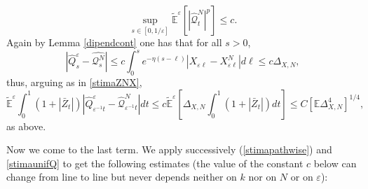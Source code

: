 \documentclass[reqno,a4paper,11 pt]{article}
\def \E {\mathbb{E}}
\def \e {\varepsilon}
\def\F {\mathcal{F}}
\numberwithin{equation}{section}
\begin{document}
\begin{equation}\label{stimaunifQ}
\sup_{s \in [0, 1/\e] } \widetilde{\E}^\e[|\hat{\mathcal{Q}}^{N}_t|^p]\leq c.
\end{equation}
Again by  Lemma \ref{dipendcont} one has that for all $s>0$, $$|\hat{{Q}}^\e_{ s}-\hat{\mathcal{Q}^{N}_{ s}}|\leq c\int_0^s e^{-\eta(s-\ell)}|X_{\e \ell}-X^N_{\e \ell}| d \ell\leq c\Delta_{X,N}, $$
thus, arguing as in \eqref{stimaZNX}, 
\begin{equation}\label{stimaZQ}
\displaystyle\widetilde{\E}^\e \int_0^{1}(1+|\bar{Z}_t|) |\hat{{Q}}^\e_{ \e^{-1}t}-\hat{\mathcal{Q}}^{N}_{ \e^{-1}t}|dt\leq c \widetilde{\E}^\e\left[ \Delta_{X,N}\int_0^1(1+|\bar{Z}_t|) d t\right]\leq C[\E \Delta_{X,N}^4]^{1/4},
\end{equation}
as above.


Now we come to the last term.
    We apply successively (\ref{stimapathwise})  and \eqref{stimaunifQ} to get the following estimates (the value of the constant $c$ below can change from line to line but never depends neither on $k$ nor on $N$ or on $\e$):
\end{document}
